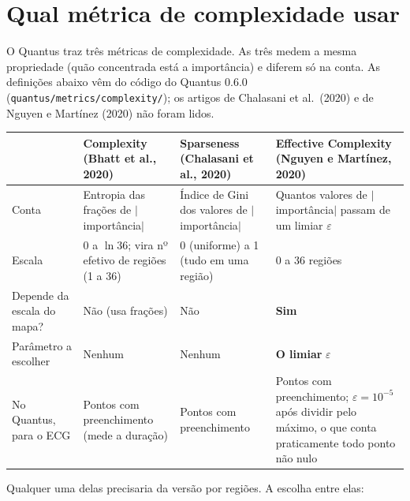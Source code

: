 \documentclass[11pt,a4paper]{article}
\begin{document}
\section{Qual métrica de complexidade usar}\label{sec:escolha}
O Quantus traz três métricas de complexidade. As três medem a mesma propriedade (quão concentrada está a importância) e diferem só na conta. As definições abaixo vêm do código do Quantus 0.6.0 (\texttt{quantus/metrics/complexity/}); os artigos de Chalasani et al.\ (2020) e de Nguyen e Martínez (2020) não foram lidos.
\begin{center}\small
\begin{tabularx}{\linewidth}{lXXX}
\toprule
& \textbf{Complexity} (Bhatt et al., 2020) & \textbf{Sparseness} (Chalasani et al., 2020) & \textbf{Effective Complexity} (Nguyen e Martínez, 2020) \\
\midrule
Conta & Entropia das frações de $|$importância$|$ & Índice de Gini dos valores de $|$importância$|$ & Quantos valores de $|$importância$|$ passam de um limiar $\varepsilon$ \\ \addlinespace
Escala & 0 a $\ln 36$; vira nº efetivo de regiões (1 a 36) & 0 (uniforme) a 1 (tudo em uma região) & 0 a 36 regiões \\ \addlinespace
Depende da escala do mapa? & Não (usa frações) & Não & \textbf{Sim} \\ \addlinespace
Parâmetro a escolher & Nenhum & Nenhum & \textbf{O limiar} $\varepsilon$ \\ \addlinespace
No Quantus, para o ECG & Pontos com preenchimento (mede a duração) & Pontos com preenchimento & Pontos com preenchimento; $\varepsilon = 10^{-5}$ após dividir pelo máximo, o que conta praticamente todo ponto não nulo \\
\bottomrule
\end{tabularx}
\end{center}
Qualquer uma delas precisaria da versão por regiões. A escolha entre elas:
\end{document}
